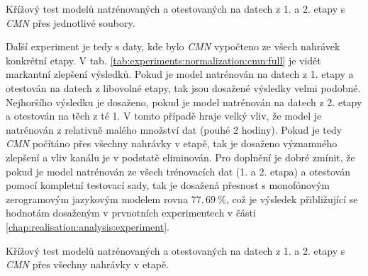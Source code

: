 \begin{table}[htpb]
  \centering
  \def\arraystretch{1.5}
  \caption{Křížový test modelů natrénovaných a otestovaných na datech z 1. a 2. etapy s \textit{CMN}  přes jednotlivé soubory.}
  \label{tab:experiments:normalization:cmn:file}
\end{table}

Další experiment je tedy s daty, kde bylo \textit{CMN}  vypočteno ze všech nahrávek konkrétní etapy. V tab. \ref{tab:experiments:normalization:cmn:full} je vidět markantní zlepšení výsledků. Pokud je model natrénován na datech z 1. etapy a otestován na datech z libovolné etapy, tak jsou dosažené výsledky velmi podobné. Nejhoršího výsledku je dosaženo, pokud je model natrénován na datech z 2. etapy a otestován na těch z té 1. V tomto případě hraje velký vliv, že model je natrénován z relativně malého množství dat (pouhé 2 hodiny). Pokud je tedy \textit{CMN}  počítáno přes všechny nahrávky v etapě, tak je dosaženo významného zlepšení a vliv kanálu je v podstatě eliminován. Pro doplnění je dobré zmínit, že pokud je model natrénován ze všech trénovacích dat (1. a 2. etapa) a otestován pomocí kompletní testovací sady, tak je dosažená přesnost s monofónovým zerogramovým jazykovým modelem rovna $77,69\ \%$, což je výsledek přibližující se hodnotám dosaženým v prvnotních experimentech v části \ref{chap:realisation:analysis:experiment}.

\begin{table}[htpb]
  \centering
  \def\arraystretch{1.5}
  \caption{Křížový test modelů natrénovaných a otestovaných na datech z 1. a 2. etapy s \textit{CMN}  přes všechny nahrávky v etapě.}
  \label{tab:experiments:normalization:cmn:full}
\end{table}

